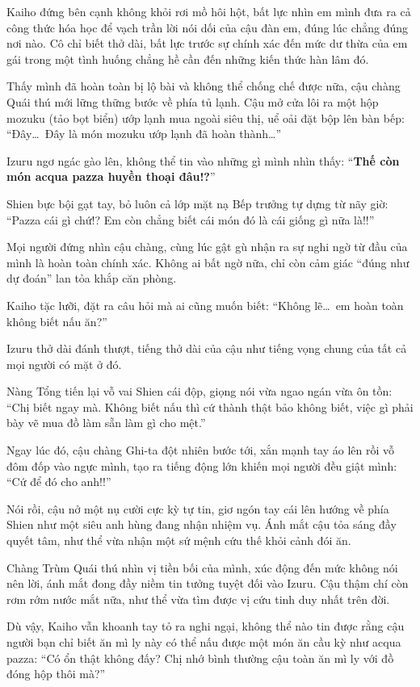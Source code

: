 \documentclass[../main.tex]{subfiles}
\begin{document}
Kaiho đứng bên cạnh không khỏi rơi mồ hôi hột, bất lực nhìn em mình đưa ra cả công thức hóa học để vạch trần lời nói dối của cậu đàn em, đúng lúc chẳng đúng nơi nào. Cô chỉ biết thở dài, bất lực trước sự chính xác đến mức dư thừa của em gái trong một tình huống chẳng hề cần đến những kiến thức hàn lâm đó.

Thấy mình đã hoàn toàn bị lộ bài và không thể chống chế được nữa, cậu chàng Quái thú mới lững thững bước về phía tủ lạnh. Cậu mở cửa lôi ra một hộp mozuku (tảo bọt biển) ướp lạnh mua ngoài siêu thị, uể oải đặt bộp lên bàn bếp: ``Đây\dots\ Đây là món mozuku ướp lạnh đã hoàn thành\dots''


Izuru ngơ ngác gào lên, không thể tin vào những gì mình nhìn thấy: ``\textbf{Thế còn món acqua pazza huyền thoại đâu!?}''

Shien bực bội gạt tay, bỏ luôn cả lớp mặt nạ Bếp trưởng tự dựng từ nãy giờ: ``Pazza cái gì chứ!? Em còn chẳng biết cái món đó là cái giống gì nữa là!!''

Mọi người đứng nhìn cậu chàng, cùng lúc gật gù nhận ra sự nghi ngờ từ đầu của mình là hoàn toàn chính xác. Không ai bất ngờ nữa, chỉ còn cảm giác ``đúng như dự đoán'' lan tỏa khắp căn phòng.

Kaiho tặc lưỡi, đặt ra câu hỏi mà ai cũng muốn biết: ``Không lẽ\dots\ em hoàn toàn không biết nấu ăn?''

Izuru thở dài đánh thượt, tiếng thở dài của cậu như tiếng vọng chung của tất cả mọi người có mặt ở đó.

Nàng Tổng tiến lại vỗ vai Shien cái độp, giọng nói vừa ngao ngán vừa ôn tồn: ``Chị biết ngay mà. Không biết nấu thì cứ thành thật bảo không biết, việc gì phải bày vẽ mua đồ làm sẵn làm gì cho mệt.''

Ngay lúc đó, cậu chàng Ghi-ta đột nhiên bước tới, xắn mạnh tay áo lên rồi vỗ đôm đốp vào ngực mình, tạo ra tiếng động lớn khiến mọi người đều giật mình: ``Cứ để đó cho anh!!''

Nói rồi, cậu nở một nụ cười cực kỳ tự tin, giơ ngón tay cái lên hướng về phía Shien như một siêu anh hùng đang nhận nhiệm vụ. Ánh mắt cậu tỏa sáng đầy quyết tâm, như thể vừa nhận một sứ mệnh cứu thế khỏi cảnh đói ăn.

Chàng Trùm Quái thú nhìn vị tiền bối của mình, xúc động đến mức không nói nên lời, ánh mắt đong đầy niềm tin tưởng tuyệt đối vào Izuru. Cậu thậm chí còn rơm rớm nước mắt nữa, như thể vừa tìm được vị cứu tinh duy nhất trên đời.

Dù vậy, Kaiho vẫn khoanh tay tỏ ra nghi ngại, không thể nào tin được rằng cậu người bạn chỉ biết ăn mì ly này có thể nấu được một món ăn cầu kỳ như acqua pazza: ``Có ổn thật không đấy? Chị nhớ bình thường cậu toàn ăn mì ly với đồ đóng hộp thôi mà?''
\end{document}
